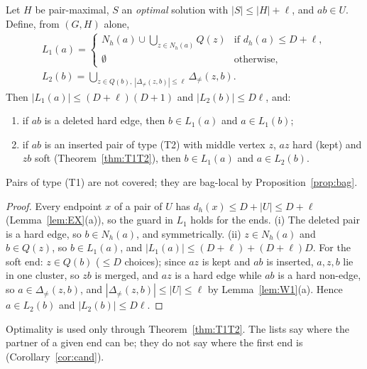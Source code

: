 \begin{proposition}\label{prop:candlist}
Let $H$ be pair-maximal, $S$ an \emph{optimal} solution with $|S|\le|H|+\ell$, and $ab\in U$. Define, from $(G,H)$ alone,
\[\begin{gathered}
L_1(a)=\begin{cases}N_h(a)\cup\bigcup_{z\in N_h(a)}Q(z)&\text{if }d_h(a)\le D+\ell,\\ \emptyset&\text{otherwise,}\end{cases}\\
L_2(b)=\bigcup_{z\in Q(b),\ |\Delta_{\neq}(z,b)|\le\ell}\Delta_{\neq}(z,b).\end{gathered}
\]
Then $|L_1(a)|\le(D+\ell)(D+1)$ and $|L_2(b)|\le D\ell$, and:
\begin{enumerate}
\item[(i)] if $ab$ is a deleted hard edge, then $b\in L_1(a)$ and $a\in L_1(b)$;
\item[(ii)] if $ab$ is an inserted pair of type (T2) with middle vertex $z$, $az$ hard (kept) and $zb$ soft (Theorem~\ref{thm:T1T2}), then $b\in L_1(a)$ and $a\in L_2(b)$.
\end{enumerate}
Pairs of type (T1) are not covered; they are bag-local by Proposition~\ref{prop:bag}.
\end{proposition}
\begin{proof}
Every endpoint $x$ of a pair of $U$ has $d_h(x)\le D+|U|\le D+\ell$ (Lemma~\ref{lem:EX}(a)), so the guard in $L_1$ holds for the ends. (i) The deleted pair is a hard edge, so $b\in N_h(a)$, and symmetrically. (ii) $z\in N_h(a)$ and $b\in Q(z)$, so $b\in L_1(a)$, and $|L_1(a)|\le(D+\ell)+(D+\ell)D$. For the soft end: $z\in Q(b)$ ($\le D$ choices); since $az$ is kept and $ab$ is inserted, $a,z,b$ lie in one cluster, so $zb$ is merged, and $az$ is a hard edge while $ab$ is a hard non-edge, so $a\in\Delta_{\neq}(z,b)$, and $|\Delta_{\neq}(z,b)|\le|U|\le\ell$ by Lemma~\ref{lem:W1}(a). Hence $a\in L_2(b)$ and $|L_2(b)|\le D\ell$.
\end{proof}
Optimality is used only through Theorem~\ref{thm:T1T2}. The lists say where the partner of a given end can be; they do not say where the first end is (Corollary~\ref{cor:cand}).

